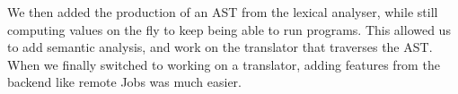 We then added the production of an AST from the lexical analyser, while still computing values on the fly to keep being able to run programs.
This allowed us to add semantic analysis, and work on the translator that traverses the AST.
When we finally switched to working on a translator, adding features from the backend like remote Jobs was much easier.
